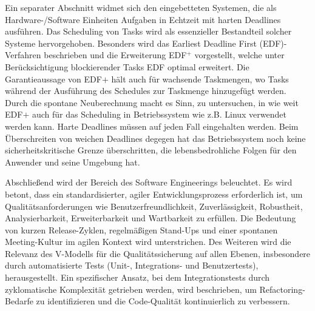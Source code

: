 \documentclass{scrarticle}
\numberwithin{equation}{section}
\begin{document}
Ein separater Abschnitt widmet sich den eingebetteten Systemen, die als Hardware-/Software Einheiten Aufgaben in Echtzeit mit harten Deadlines ausführen. Das Scheduling von Tasks wird als essenzieller Bestandteil solcher Systeme hervorgehoben. Besonders wird das Earliest Deadline First (EDF)-Verfahren beschrieben und die Erweiterung EDF$^+$ vorgestellt, welche unter Berücksichtigung blockierender Tasks EDF optimal erweitert. Die Garantieaussage von EDF$+$ hält auch für wachsende Taskmengen, wo Tasks während der Ausführung des Schedules zur Taskmenge hinzugefügt werden. Durch die spontane Neuberechnung macht es Sinn, zu untersuchen, in wie weit EDF$+$ auch für das Scheduling in Betriebssystem wie z.B. Linux verwendet werden kann. Harte Deadlines müssen auf jeden Fall eingehalten werden. Beim Überschreiten von weichen Deadlines degegen hat das Betriebssystem noch keine sicherheitskritische Grenze überschritten, die lebensbedrohliche Folgen für den Anwender und seine Umgebung hat. 

Abschließend wird der Bereich des Software Engineerings beleuchtet. Es wird betont, dass ein standardisierter, agiler Entwicklungsprozess erforderlich ist, um Qualitätsanforderungen wie Benutzerfreundlichkeit, Zuverlässigkeit, Robustheit, Analysierbarkeit, Erweiterbarkeit und Wartbarkeit zu erfüllen. Die Bedeutung von kurzen Release-Zyklen, regelmäßigen Stand-Ups und einer spontanen Meeting-Kultur im agilen Kontext wird unterstrichen. Des Weiteren wird die Relevanz des V-Modells für die Qualitätssicherung auf allen Ebenen, insbesondere durch automatisierte Tests (Unit-, Integrations- und Benutzertests), herausgestellt. Ein spezifischer Ansatz, bei dem Integrationstests durch zyklomatische Komplexität getrieben werden, wird beschrieben, um Refactoring-Bedarfe zu identifizieren und die Code-Qualität kontinuierlich zu verbessern.
\end{document}
